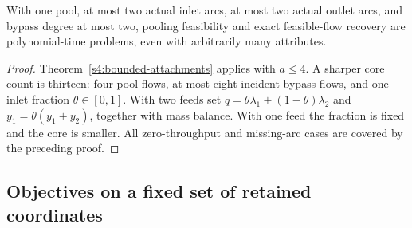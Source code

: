 \begin{corollary}\label{s4:two-two-feasibility}
With one pool, at most two actual inlet arcs, at most two actual outlet
arcs, and bypass degree at most two, pooling feasibility and exact
feasible-flow recovery are polynomial-time problems, even with
arbitrarily many attributes.
\end{corollary}
\begin{proof}
Theorem~\ref{s4:bounded-attachments} applies with $a\le4$. A sharper
core count is thirteen: four pool flows, at most eight incident bypass
flows, and one inlet fraction $\theta\in[0,1]$. With two feeds set
$q=\theta\lambda_1+(1-\theta)\lambda_2$ and
$y_1=\theta(y_1+y_2)$, together with mass balance. With one feed the
fraction is fixed and the core is smaller. All zero-throughput and
missing-arc cases are covered by the preceding proof.
\end{proof}

\subsection{Objectives on a fixed set of retained coordinates}
\label{s4:bounded-support}

